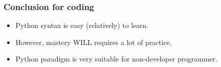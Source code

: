 \begin{frame}[fragile]
\frametitle{Conclusion for coding}
\begin{itemize}
\item Python syntax is easy (relatively) to learn.
\item However, mastery WILL requires a lot of practice.
\item Python paradigm is very suitable for non-developer programmer.
\end{itemize}

\end{frame}